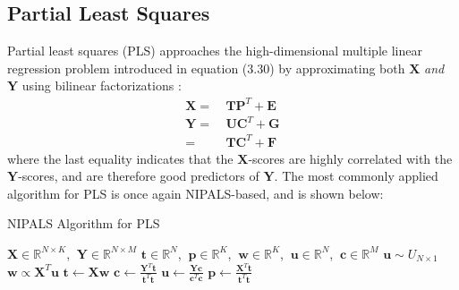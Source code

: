 \subsection{Partial Least Squares}

\begin{doublespace}
Partial least squares (PLS) approaches the high-dimensional multiple linear
regression problem introduced in equation (3.30) by approximating both
$\mathbf{X}$ \emph{and} $\mathbf{Y}$ using bilinear factorizations
\cite{wold:cils2001}:
\begin{align}
\mathbf{X} =& \: \mathbf{T} \mathbf{P}^T + \mathbf{E} \\
\mathbf{Y} =& \: \mathbf{U} \mathbf{C}^T + \mathbf{G} \\
           =& \: \mathbf{T} \mathbf{C}^T + \mathbf{F} \nonumber
\end{align}
where the last equality indicates that the $\mathbf{X}$-scores are highly
correlated with the $\mathbf{Y}$-scores, and are therefore good predictors
of $\mathbf{Y}$. The most commonly applied algorithm for PLS is once again
NIPALS-based, and is shown below:
\end{doublespace}

\begin{algorithm}[H]
\caption{NIPALS Algorithm for PLS}
\label{algorithm.3.2}
\begin{algorithmic}[1]
\REQUIRE $\mathbf{X} \in \mathbb{R}^{N \times K}$,%
       $\:\mathbf{Y} \in \mathbb{R}^{N \times M}$
\ENSURE $\mathbf{t} \in \mathbb{R}^N$,%
      $\:\mathbf{p} \in \mathbb{R}^K$,%
      $\:\mathbf{w} \in \mathbb{R}^K$,%
      $\:\mathbf{u} \in \mathbb{R}^N$,%
      $\:\mathbf{c} \in \mathbb{R}^M$
\STATE $\mathbf{u} \sim U_{N \times 1}$ 
\REPEAT
  \STATE $\mathbf{w} \propto \mathbf{X}^T \mathbf{u}$
  \STATE $\mathbf{t} \gets \mathbf{X} \mathbf{w}$
  \STATE $\mathbf{c} \gets \tfrac{\mathbf{Y}^T \mathbf{t}}
                                 {\mathbf{t}^T \mathbf{t}}$
  \STATE $\mathbf{u} \gets \tfrac{\mathbf{Y} \mathbf{c}}
                                 {\mathbf{c}^T \mathbf{c}}$
\UNTIL{$\tau < \varepsilon$}
\STATE $\mathbf{p} \gets \tfrac{\mathbf{X}^T \mathbf{t}}
                               {\mathbf{t}^T \mathbf{t}}$
\end{algorithmic}
\end{algorithm}

